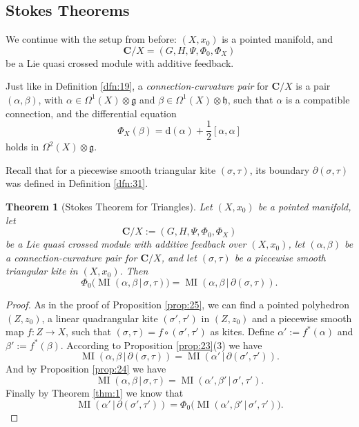\documentclass[10pt, a4paper]{amsart}
\newtheorem{thm}[equation]{Theorem}
\theoremstyle{definition}
\numberwithin{equation}{section}
\newcommand{\opn}{\operatorname}
\newcommand{\mfrak}[1]{\mathfrak{#1}}
\newcommand{\mbf}[1]{\mathbf{#1}}
\newcommand{\mrm}[1]{\mathrm{#1}}
\newcommand{\smfrac}[2]{{\textstyle \frac{#1}{#2}}}
\renewcommand{\vert}{\, | \,}
\newcommand{\g}{\mfrak{g}}
\newcommand{\h}{\mfrak{h}}
\renewcommand{\d}{\mrm{d}}
\newcommand{\lb}{\linebreak}
\begin{document}
\subsection{Stokes Theorems}
We continue with the setup from before: $(X, x_0)$ is a pointed manifold, and
\[ \mbf{C} / X = (G, H, \Psi, \Phi_0, \Phi_X) \]
be a Lie quasi crossed module with additive feedback. 

Just like in Definition \ref{dfn:19}, a {\em connection-curvature pair} for
$\mbf{C} / X$ is a pair $(\alpha, \beta)$, with 
$\alpha \in \Omega^1(X) \otimes \g$ and 
$\beta \in \Omega^1(X) \otimes \h$,
such that $\alpha$ is a compatible connection, and  the differential equation
\[ \Phi_X(\beta) = \d(\alpha) + \smfrac{1}{2} [\alpha, \alpha] \]
holds in $\Omega^2(X) \otimes \g$.

Recall that for a piecewise smooth triangular kite $(\sigma, \tau)$, its
boundary
$\partial (\sigma, \tau)$ was defined in Definition \ref{dfn:31}.

\begin{thm}[Stokes Theorem for Triangles] \label{thm:520}
Let $(X, x_0)$ be a pointed manifold, let
\[ \mbf{C} / X := (G, H, \Psi, \Phi_0, \Phi_X) \]
be a Lie quasi crossed module with additive feedback over $(X, x_0)$,
let $(\alpha, \beta)$ be a \lb connection-curvature pair for
$\mbf{C} / X$, and let
$(\sigma, \tau)$ be a piecewise smooth triangular kite in $(X, x_0)$. Then
\[ \Phi_0 \bigl( \opn{MI}(\alpha, \beta \vert \sigma, \tau) \bigr) = 
\opn{MI}(\alpha, \beta \vert \partial (\sigma, \tau)) . \]
\end{thm}

\begin{proof}
As in the proof of Proposition \ref{prop:25}, we can find a pointed
polyhedron $(Z, z_0)$, a linear quadrangular kite $(\sigma', \tau')$ in 
$(Z, z_0)$ and a piecewise smooth map $f : Z \to X$, such that  
$(\sigma, \tau) = f \circ (\sigma', \tau')$ as kites. 
Define
$\alpha' := f^*(\alpha)$ and $\beta' := f^*(\beta)$.
According to Proposition \ref{prop:23}(3) we have
\[ \opn{MI}(\alpha, \beta \vert \partial (\sigma, \tau)) = 
\opn{MI}(\alpha' \vert \partial (\sigma', \tau')) . \]
And by Proposition \ref{prop:24} we have
\[ \opn{MI}(\alpha, \beta \vert \sigma, \tau)  = 
\opn{MI}(\alpha', \beta' \vert \sigma', \tau')  . \]
Finally by Theorem \ref{thm:1} we know that
\[ \opn{MI}(\alpha' \vert \partial (\sigma', \tau')) = 
\Phi_0 \bigl( \opn{MI}(\alpha', \beta' \vert \sigma', \tau') \bigr) . \]
\end{proof}
\end{document}
